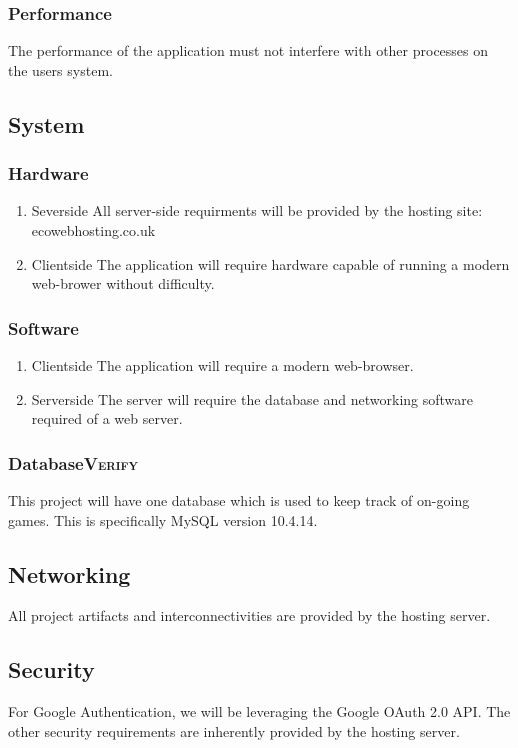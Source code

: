 \documentclass[11pt]{article}
\begin{document}
\subsubsection{Performance}
\label{sec:org3d88320}
The performance of the application must not interfere with other
processes on the users system.
\subsection{System}
\label{sec:orga37de9e}
\subsubsection{Hardware}
\label{sec:orgc32c366}
\begin{enumerate}
\item Severside
\label{sec:org2bc5f76}
All server-side requirments will be provided by the hosting site: ecowebhosting.co.uk
\item Clientside
\label{sec:org61d5652}
The application will require hardware capable of running a modern web-brower without difficulty.
\end{enumerate}
\subsubsection{Software}
\label{sec:org12fcb68}
\begin{enumerate}
\item Clientside
\label{sec:orgf9dfc96}
The application will require a modern web-browser.
\item Serverside
\label{sec:org0768bb3}
The server will require the database and networking software required of a web server.
\end{enumerate}
\subsubsection{Database\hfill{}\textsc{Verify}}
\label{sec:org23811f2}
This project will have one database which is used to keep track of
on-going games. This is specifically MySQL version 10.4.14.

\subsection{Networking}
\label{sec:org45a4f16}
All project artifacts and interconnectivities are provided by the
hosting server.
\subsection{Security}
\label{sec:org90365fe}
For Google Authentication, we will be leveraging the Google OAuth
2.0 API. The other security requirements are inherently provided by
the hosting server.
\end{document}
